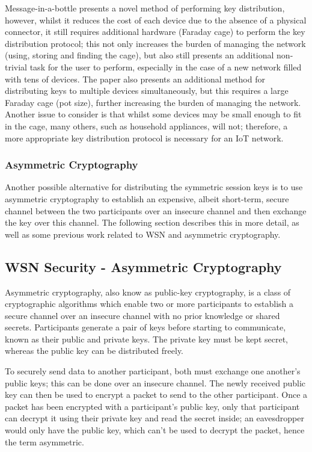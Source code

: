\documentclass{mprop}
\begin{document}
Message-in-a-bottle presents a novel method of performing key distribution, however, whilst it reduces the cost of each device due to the absence of a physical connector, it still requires additional hardware (Faraday cage) to perform the key distribution protocol; this not only increases the burden of managing the network (using, storing and finding the cage), but also still presents an additional non-trivial task for the user to perform, especially in the case of a new network filled with tens of devices. The paper also presents an additional method for distributing keys to multiple devices simultaneously, but this requires a large Faraday cage (pot size), further increasing the burden of managing the network. Another issue to consider is that whilst some devices may be small enough to fit in the cage, many others, such as household appliances, will not; therefore, a more appropriate key distribution protocol is necessary for an IoT network.


\subsubsection{Asymmetric Cryptography} %
\label{ssub:asymmetric_cryptography}
Another possible alternative for distributing the symmetric session keys is to use asymmetric cryptography to establish an expensive, albeit short-term, secure channel between the two participants over an insecure channel and then exchange the key over this channel. The following section describes this in more detail, as well as some previous work related to WSN and asymmetric cryptography.

\subsection{WSN Security - Asymmetric Cryptography} %
\label{sub:asymmetric_security}
Asymmetric cryptography, also know as public-key cryptography, is a class of cryptographic algorithms which enable two or more participants to establish a secure channel over an insecure channel with no prior knowledge or shared secrets. Participants generate a pair of keys before starting to communicate, known as their public and private keys. The private key must be kept secret, whereas the public key can be distributed freely. 

To securely send data to another participant, both must exchange one another's public keys; this can be done over an insecure channel. The newly received public key can then be used to encrypt a packet to send to the other participant. Once a packet has been encrypted with a participant's public key, only that participant can decrypt it using their private key and read the secret inside; an eavesdropper would only have the public key, which can't be used to decrypt the packet, hence the term asymmetric. 
\end{document}
